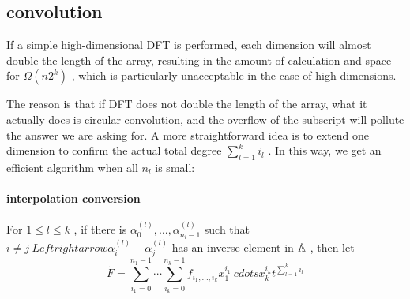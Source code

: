 \subsection { convolution }

If a simple high-dimensional DFT is performed, each dimension will almost double the length of the array, resulting in the amount of calculation and space for $ \Omega (n 2 ^k) $ , which is particularly unacceptable in the case of high dimensions.

The reason is that if DFT does not double the length of the array, what it actually does is circular convolution, and the overflow of the subscript will pollute the answer we are asking for. A more straightforward idea is to extend one dimension to confirm the actual total degree $ \sum _{l=1}^k i_l $ . In this way, we get an efficient algorithm when all $ n_l $ is small:

\paragraph { interpolation conversion }
For $ 1 \le l \le k $ , if there is $ \alpha ^{(l)}_ 0 , \dots , \alpha ^{(l)}_{n_l-1} $ such that $ i \neq j \ Leftrightarrow  \alpha ^{(l)}_i- \alpha ^{(l)}_j $ has an inverse element in $  \mathbb A $ , then let
$$
\tilde F = \sum _{i_1=0}^{n_1-1} \cdots  \sum _{i_k=0}^{n_k-1} f_{i_1, \dots ,i_k} x_ 1 ^{i_1} \ cdots x_k^{i_k} t^{ \sum _{l=1}^k i_l}
$$

